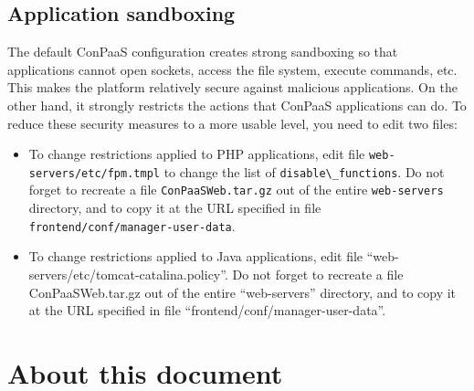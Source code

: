 \documentclass[10pt]{article}
\begin{document}
\subsection{Application sandboxing}

The default ConPaaS configuration creates strong sandboxing so that
applications cannot open sockets, access the file system, execute
commands, etc. This makes the platform relatively secure against
malicious applications. On the other hand, it strongly restricts the
actions that ConPaaS applications can do. To reduce these security
measures to a more usable level, you need to edit two files:

\begin{itemize}
\item To change restrictions applied to PHP applications, edit file
  \verb+web-servers/etc/fpm.tmpl+ to change the list of
  \verb+disable\_functions+. Do not forget to recreate a file
  \verb+ConPaaSWeb.tar.gz+ out of the entire \verb+web-servers+
  directory, and to copy it at the URL specified in file
  \verb+frontend/conf/manager-user-data+.
\item To change restrictions applied to Java applications, edit file
  ``web-servers/etc/tomcat-catalina.policy''. Do not forget to
  recreate a file ConPaaSWeb.tar.gz out of the entire ``web-servers''
  directory, and to copy it at the URL specified in file
  ``frontend/conf/manager-user-data''.
\end{itemize}

\section{About this document}
\label{sec:about}
\end{document}
